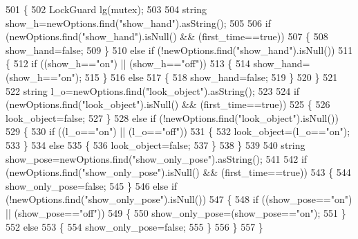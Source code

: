 \begin{DoxyCode}
501 \{
502     LockGuard lg(mutex);
503 
504     \textcolor{keywordtype}{string} show\_h=newOptions.find(\textcolor{stringliteral}{"show\_hand"}).asString();
505 
506     \textcolor{keywordflow}{if} (newOptions.find(\textcolor{stringliteral}{"show\_hand"}).isNull() && (first\_time==\textcolor{keyword}{true}))
507     \{
508         show_hand=\textcolor{keyword}{false};
509     \}
510     \textcolor{keywordflow}{else} \textcolor{keywordflow}{if} (!newOptions.find(\textcolor{stringliteral}{"show\_hand"}).isNull())
511     \{
512         \textcolor{keywordflow}{if} ((show\_h==\textcolor{stringliteral}{"on"}) || (show\_h==\textcolor{stringliteral}{"off"}))
513         \{
514             show_hand=(show\_h==\textcolor{stringliteral}{"on"});
515         \}
516         \textcolor{keywordflow}{else}
517         \{
518             show_hand=\textcolor{keyword}{false};
519         \}
520     \}
521 
522     \textcolor{keywordtype}{string} l\_o=newOptions.find(\textcolor{stringliteral}{"look\_object"}).asString();
523 
524     \textcolor{keywordflow}{if} (newOptions.find(\textcolor{stringliteral}{"look\_object"}).isNull() && (first\_time==\textcolor{keyword}{true}))
525     \{
526         look_object=\textcolor{keyword}{false};
527     \}
528     \textcolor{keywordflow}{else} \textcolor{keywordflow}{if} (!newOptions.find(\textcolor{stringliteral}{"look\_object"}).isNull())
529     \{
530         \textcolor{keywordflow}{if} ((l\_o==\textcolor{stringliteral}{"on"}) || (l\_o==\textcolor{stringliteral}{"off"}))
531         \{
532             look_object=(l\_o==\textcolor{stringliteral}{"on"});
533         \}
534         \textcolor{keywordflow}{else}
535         \{
536             look_object=\textcolor{keyword}{false};
537         \}
538     \}
539 
540     \textcolor{keywordtype}{string} show\_pose=newOptions.find(\textcolor{stringliteral}{"show\_only\_pose"}).asString();
541 
542     \textcolor{keywordflow}{if} (newOptions.find(\textcolor{stringliteral}{"show\_only\_pose"}).isNull() && (first\_time==\textcolor{keyword}{true}))
543     \{
544         show_only_pose=\textcolor{keyword}{false};
545     \}
546     \textcolor{keywordflow}{else} \textcolor{keywordflow}{if} (!newOptions.find(\textcolor{stringliteral}{"show\_only\_pose"}).isNull())
547     \{
548         \textcolor{keywordflow}{if} ((show\_pose==\textcolor{stringliteral}{"on"}) || (show\_pose==\textcolor{stringliteral}{"off"}))
549         \{
550             show_only_pose=(show\_pose==\textcolor{stringliteral}{"on"});
551         \}
552         \textcolor{keywordflow}{else}
553         \{
554             show_only_pose=\textcolor{keyword}{false};
555         \}
556     \}
557 \}
\end{DoxyCode}
